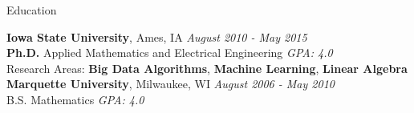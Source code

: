 \documentclass{resume} %
\begin{document}



\begin{rSection}{Education}
	
	{\bf Iowa State University}, Ames, IA \hfill {\em August 2010 - May 2015} \\ 
	{\bf Ph.D. } Applied Mathematics and Electrical Engineering \hfill {\em GPA: 4.0} \\
	Research Areas: {\bf Big Data Algorithms}, {\bf Machine Learning}, {\bf Linear Algebra} \vspace{.1in}\\
	{\bf Marquette University}, Milwaukee, WI \hfill {\em August 2006 - May 2010 }\\
	B.S. Mathematics \hfill {\em GPA: 4.0}
	
\end{rSection}


\end{document}
